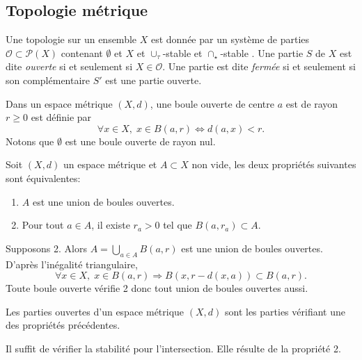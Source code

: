 \subsection{Topologie métrique}
\begin{defin}\label{Def:topologie}
Une topologie sur un ensemble $X$ est donnée par un système de parties $\mathcal{O} \subset \mathcal{P}(X)$ contenant $\emptyset$ et $X$ et $\cup_\tau$-stable et $\cap_\star$-stable  .\newline
Une partie $S$ de $X$ est dite \emph{ouverte} si et seulement si $X\in \mathcal{O}$. Une partie est dite \emph{fermée}  si et seulement si son complémentaire $S'$ est une partie ouverte.
 
\end{defin}
\noindent Dans un espace métrique $(X,d)$, une boule ouverte de centre $a$ est de rayon $r\geq 0$ est définie par
\begin{displaymath}
 \forall x \in X, \; x\in B(a,r) \Leftrightarrow d(a,x) < r.
\end{displaymath}
Notons que $\emptyset$ est une boule ouverte de rayon nul.
\begin{prop}
 Soit $(X,d)$ un espace métrique et $A \subset X$ non vide, les deux propriétés suivantes sont équivalentes:
 \begin{enumerate}
  \item $A$ est une union de boules ouvertes.
  \item Pour tout $a\in A$, il existe $r_a >0$ tel que $B(a,r_a)\subset A$.
 \end{enumerate}
\end{prop}
\begin{demo}
Supposons 2. Alors $A = \bigcup_{a \in A} B(a,r)$ est une union de boules ouvertes.\newline
D'après l'inégalité triangulaire,
  \begin{displaymath}
   \forall x \in X, \; x\in B(a,r) \Rightarrow B(x,r- d(x,a)) \subset B(a,r).
  \end{displaymath}
Toute boule ouverte vérifie 2 donc tout union de boules ouvertes aussi.
\end{demo}
\begin{defi}
 Les parties ouvertes d'un espace métrique $(X,d)$ sont les parties vérifiant une des propriétés précédentes.
\end{defi}
\begin{demo}
Il suffit de vérifier la stabilité pour l'intersection. Elle résulte de la propriété 2.
\end{demo}

